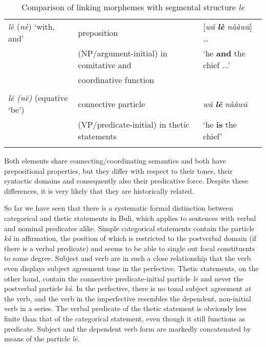 \documentclass[output=paper]{langsci/langscibook}
\begin{document}
\begin{table}
\caption{Comparison of linking morphemes with segmental structure \textit{le}}
\label{tab:Schwarz:3}


\begin{tabularx}{\textwidth}{lQl}
\lsptoprule

{\textit{lè} (\textit{nè})} {‘with, and’} & {preposition} & { [\textit{wá} \textbf{\textit{lè} }\textit{ nààw\={a}}] …} \\ 
& {(NP/argument-initial) in comitative and } & {‘he \textbf{and} the chief ...’}\\
& {coordinative function}
\\ \\
{\textit{l\={e} (n\={e})}} {(equative ‘be’)} & {connective particle } & {\textit{wá} \textbf{\textit{l\={e}}}\textit{ nààw\={a}}} \\
& {(VP/predicate-initial) in thetic statements} & {‘he \textbf{is} the chief’}\\
\lspbottomrule
\end{tabularx}
\end{table}

Both elements share connecting/coordinating semantics and both have prepositional properties, but they differ with respect to their tones, their syntactic domains and consequently also their predicative force. Despite these differences, it is very likely that they are historically related.

So far we have seen that there is a systematic formal distinction between categorical and thetic statements in Buli, which applies to sentences with verbal and nominal predicates alike. Simple categorical statements contain the particle \textit{ká} in affirmation, the position of which is restricted to the postverbal domain (if there is a verbal predicate) and seems to be able to single out focal constituents to some degree. Subject and verb are in such a close relationship that the verb even displays subject agreement tone in the perfective. Thetic statements, on the other hand, contain the connective predicate-initial particle \textit{l\={e}} and never the postverbal particle \textit{ká}. In the perfective, there is no tonal subject agreement at the verb, and the verb in the imperfective resembles the dependent, non-initial verb in a series. The verbal predicate of the thetic statement is obviously less finite than that of the categorical statement, even though it still functions as predicate. Subject and the dependent verb form are markedly concatenated by means of the particle \textit{l\={e}}.
\end{document}
